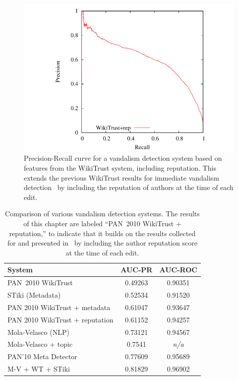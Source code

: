 \begin{figure}[tbhp]
  \centering
  \includegraphics{part-Q10-vandalism/graph-wikitrust-pr}
  \caption[Precision-Recall curve for vandalism detection]{%
    Precision-Recall curve for a vandalism detection system based
    on features from the WikiTrust system, including reputation.
    This extends the previous WikiTrust results for immediate vandalism
    detection~\cite{Adler2010b} by including the reputation of authors
    at the time of each edit.}
  \label{fig:vandalrep-prcurve}
\end{figure}

\begin{table}[tbhp]
  \begin{center}
    \begin{tabular}{|l|c|c|}
      \hline
      \textbf{System} & \textbf{AUC-PR} & \textbf{AUC-ROC} \\
      \hline
      \hline
      PAN~2010 WikiTrust~\cite{Potthast2010b} & 0.49263 & 0.90351 \\
      STiki (Metadata)~\cite{Adler2011a} & 0.52534 & 0.91520 \\
      PAN 2010 WikiTrust + metadata~\cite{Adler2011a} & 0.61047 & 0.93647 \\
      PAN 2010 WikiTrust + reputation & 0.61152 & 0.94257 \\
      Mola-Velasco (NLP)~\cite{Adler2011a} & 0.73121 & 0.94567 \\
      Mola-Velasco + topic~\cite{Mola2011} & 0.7541 & \textit{n/a} \\
      PAN'10 Meta Detector~\cite{Potthast2010b} & 0.77609 & 0.95689 \\
      M-V + WT + STiki~\cite{Adler2011a} & 0.81829 & 0.96902 \\
      \hline
    \end{tabular}
  \end{center}
  \caption[Comparison of vandalism detection systems]{%
    Comparison of various vandalism detection systems.
    The results of this chapter are labeled ``PAN~2010 WikiTrust +
    reputation,'' to indicate that it builds on the results collected
    for and presented in~\cite{Potthast2010b} by including the
    author reputation score at the time of each edit.}
  \label{tab:vandalrep-context}
\end{table}

